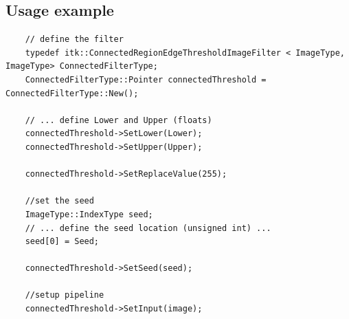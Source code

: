 \documentclass{InsightArticle}
\begin{document}
\subsection{Usage example}
\small
\begin{verbatim}
	// define the filter
	typedef itk::ConnectedRegionEdgeThresholdImageFilter < ImageType, ImageType> ConnectedFilterType;
	ConnectedFilterType::Pointer connectedThreshold = ConnectedFilterType::New();
	
	// ... define Lower and Upper (floats)
	connectedThreshold->SetLower(Lower);
	connectedThreshold->SetUpper(Upper);
	
	connectedThreshold->SetReplaceValue(255);
	
	//set the seed
	ImageType::IndexType seed;
	// ... define the seed location (unsigned int) ...
  	seed[0] = Seed;

	connectedThreshold->SetSeed(seed);
		
	//setup pipeline
	connectedThreshold->SetInput(image);
\end{verbatim}


\normalsize
\end{document}
